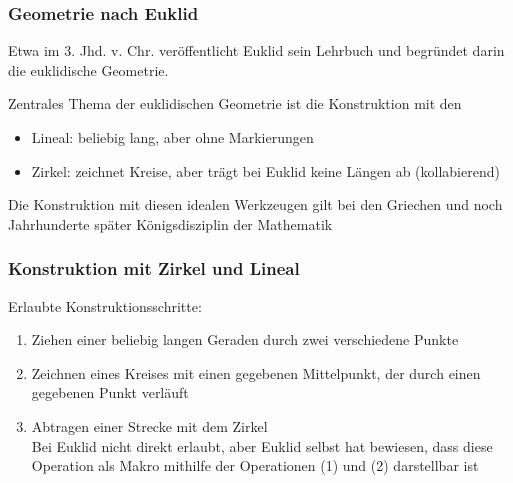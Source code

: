 \documentclass[onlymath]{beamer}
\begin{document}
\begin{frame}\frametitle{Geometrie nach Euklid}

Etwa im 3. Jhd. v. Chr. veröffentlicht Euklid sein Lehrbuch 
 und begründet darin die euklidische Geometrie.
\bigskip

Zentrales Thema der euklidischen Geometrie ist die
Konstruktion mit den 

\begin{itemize}
\item \alert{Lineal:} beliebig lang, aber ohne Markierungen
\item \alert{Zirkel:} zeichnet Kreise, aber trägt bei Euklid keine Längen ab (kollabierend)
\end{itemize}

Die Konstruktion mit diesen idealen Werkzeugen gilt bei den Griechen und noch
Jahrhunderte später Königsdisziplin der Mathematik

\end{frame}

\begin{frame}\frametitle{Konstruktion mit Zirkel und Lineal}


\alert{Erlaubte Konstruktionsschritte:}
\begin{enumerate}[(1)]
\item Ziehen einer beliebig langen Geraden durch zwei verschiedene Punkte
\item Zeichnen eines Kreises mit einen gegebenen Mittelpunkt, der durch einen gegebenen Punkt verläuft
\item Abtragen einer Strecke mit dem Zirkel\\
{\tiny Bei Euklid nicht direkt erlaubt, aber Euklid selbst hat bewiesen, dass diese Operation als Makro mithilfe der Operationen (1) und (2) darstellbar ist
}
\end{enumerate}


\end{frame}
\end{document}
